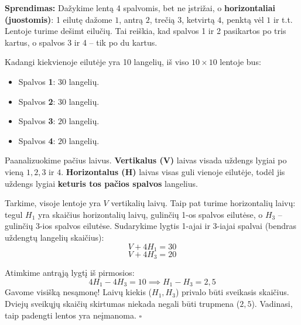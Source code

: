 \documentclass[11pt,a4paper]{scrartcl}
\newenvironment{solution}
    {\begin{list}{}{\setlength{\leftmargin}{10pt}\setlength{\rightmargin}{10pt}}\item[]}
    {\end{list}}
\begin{document}
\begin{solution}
\textbf{Sprendimas:}
Dažykime lentą 4 spalvomis, bet ne įstrižai, o \textbf{horizontaliai (juostomis)}:
1 eilutę dažome $1$, antrą $2$, trečią $3$, ketvirtą $4$, penktą vėl $1$ ir t.t.
Lentoje turime dešimt eilučių. Tai reiškia, kad spalvos 1 ir 2 pasikartos po tris kartus, o spalvos 3 ir 4 – tik po du kartus.

\begin{center}
\end{center}

Kadangi kiekvienoje eilutėje yra 10 langelių, iš viso $10 \times 10$ lentoje bus:
\begin{itemize}
    \item Spalvos \textbf{1}: $30$ langelių.
    \item Spalvos \textbf{2}: $30$ langelių.
    \item Spalvos \textbf{3}: $20$ langelių.
    \item Spalvos \textbf{4}: $20$ langelių.
\end{itemize}

Paanalizuokime pačius laivus. \textbf{Vertikalus (V)} laivas visada uždengs lygiai po vieną $1, 2, 3$ ir $4$. \textbf{Horizontalus (H)} laivas visas guli vienoje eilutėje, todėl jis uždengs lygiai \textbf{keturis tos pačios spalvos} langelius.

Tarkime, visoje lentoje yra $V$ vertikalių laivų. Taip pat turime horizontalių laivų: tegul $H_1$ yra skaičius horizontalių laivų, gulinčių 1-os spalvos eilutėse, o $H_3$ – gulinčių 3-ios spalvos eilutėse.
Sudarykime lygtis 1-ajai ir 3-iajai spalvai (bendras uždengtų langelių skaičius):
\[ V + 4H_1 = 30 \]
\[ V + 4H_3 = 20 \]

Atimkime antrąją lygtį iš pirmosios:
\[ 4H_1 - 4H_3 = 10 \implies H_1 - H_3 = 2{,}5 \]
Gavome visišką nesąmonę! Laivų kiekis ($H_1, H_3$) privalo būti sveikasis skaičius. Dviejų sveikųjų skaičių skirtumas niekada negali būti trupmena ($2{,}5$). Vadinasi, taip padengti lentos yra neįmanoma. \hfill $\square$
\end{solution}
\end{document}
